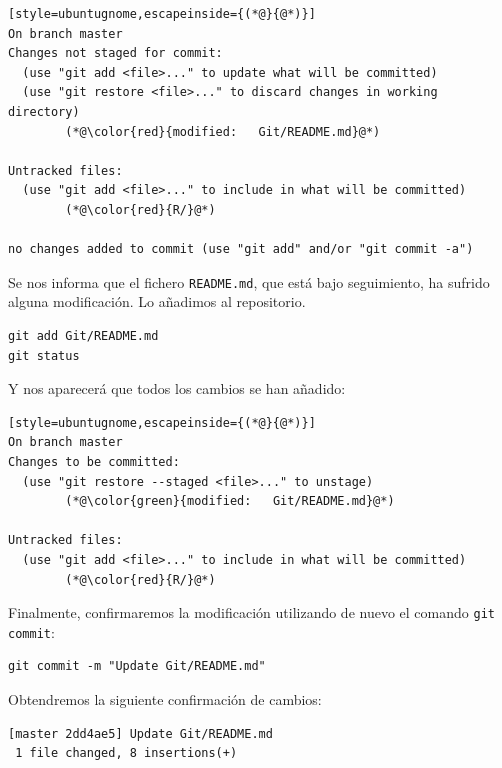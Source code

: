 \documentclass[11pt,a4paper]{article}
\theoremstyle{exercise}
\begin{document}
\begin{lstlisting}[style=ubuntugnome,escapeinside={(*@}{@*)}]
On branch master
Changes not staged for commit:
  (use "git add <file>..." to update what will be committed)
  (use "git restore <file>..." to discard changes in working directory)
        (*@\color{red}{modified:   Git/README.md}@*)

Untracked files:
  (use "git add <file>..." to include in what will be committed)
        (*@\color{red}{R/}@*)

no changes added to commit (use "git add" and/or "git commit -a")
\end{lstlisting}
Se nos informa que el fichero \texttt{README.md}, que está bajo seguimiento, ha sufrido alguna modificación. Lo añadimos al repositorio.
\begin{lstlisting}[style=ubuntugnome]
git add Git/README.md
git status
\end{lstlisting}
Y nos aparecerá que todos los cambios se han añadido:
\begin{lstlisting}[style=ubuntugnome,escapeinside={(*@}{@*)}]
On branch master
Changes to be committed:
  (use "git restore --staged <file>..." to unstage)
        (*@\color{green}{modified:   Git/README.md}@*)
        
Untracked files:
  (use "git add <file>..." to include in what will be committed)
        (*@\color{red}{R/}@*)
\end{lstlisting}
Finalmente, confirmaremos la modificación utilizando de nuevo el comando \texttt{git commit}:
\begin{lstlisting}[style=ubuntugnome]
git commit -m "Update Git/README.md"
\end{lstlisting}
Obtendremos la siguiente confirmación de cambios:
\begin{lstlisting}[style=ubuntugnome]
[master 2dd4ae5] Update Git/README.md
 1 file changed, 8 insertions(+)
\end{lstlisting}
\end{document}

